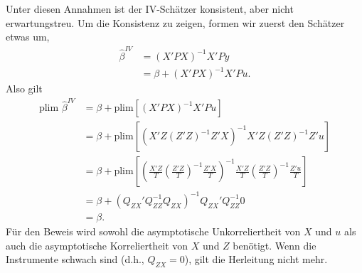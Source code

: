 \documentclass{article}
\begin{document}
Unter diesen Annahmen ist der IV-Schätzer konsistent, aber nicht
erwartungstreu. Um die Konsistenz zu zeigen, formen wir zuerst
den Schätzer etwas um,
\begin{align*}
\hat\beta^{IV} &= (X'PX)^{-1}X'Py \\
&=\beta +(X'PX)^{-1}X'Pu.
\end{align*}
Also gilt
\begin{align*}
\textrm{plim }\hat\beta^{IV} &= \beta +\textrm{plim}\left[(X'PX)^{-1}X'Pu\right] \\
&=\beta +\textrm{plim}\left[(X'Z(Z'Z)^{-1}Z'X)^{-1}X'Z(Z'Z)^{-1}Z'u\right] \\
&=\beta +\textrm{plim}\left[\left(\frac{X'Z}{T}\left(\frac{Z'Z}{T}\right)^{-1}\frac{Z'X}{T}\right)^{-1}
\frac{X'Z}{T}\left(\frac{Z'Z}{T}\right) ^{-1}\frac{Z'u}{T}\right] \\
&=\beta +(Q_{ZX}'Q_{ZZ}^{-1}Q_{ZX})^{-1}Q_{ZX}'Q_{ZZ}^{-1}0 \\
&=\beta.
\end{align*}
Für den Beweis wird sowohl die asymptotische Unkorreliertheit von 
$X$ und $u$ als auch die asymptotische Korreliertheit von $X$ und $Z$
benötigt. Wenn die Instrumente schwach sind (d.h., $Q_{ZX}=0$),
gilt die Herleitung nicht mehr.
\end{document}
